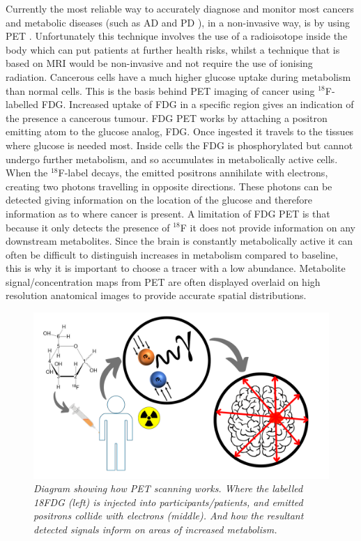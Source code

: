 Currently the most reliable way to accurately diagnose and monitor most cancers and metabolic diseases (such as \ac{AD} \cite{Shokouhi2014ImagingTomography} and \ac{PD} \cite{Meles2017MetabolicDisease}), in a non-invasive way, is by using \ac{PET} \cite{Almuhaideb201118F-FDGOncology}. Unfortunately this technique involves the use of a radioisotope inside the body which can put patients at further health risks, whilst a technique that is based on \ac{MRI} would be non-invasive and not require the use of ionising radiation. Cancerous cells have a much higher glucose uptake during metabolism than normal cells. This is the basis behind \ac{PET} imaging of cancer using $^{18}$F-labelled \ac{FDG}. Increased uptake of \ac{FDG} in a specific region gives an indication of the presence a cancerous tumour. \ac{FDG} \ac{PET} works by attaching a positron emitting atom to the glucose analog, \ac{FDG}. Once ingested it travels to the tissues where glucose is needed most. Inside cells the \ac{FDG} is phosphorylated but cannot undergo further metabolism, and so accumulates in metabolically active cells. When the $^{18}$F-label decays, the emitted positrons annihilate with electrons, creating two photons travelling in opposite directions. These photons can be detected giving information on the location of the glucose and therefore information as to where cancer is present. A limitation of \ac{FDG} \ac{PET} is that because it only detects the presence of $^{18}$F it does not provide information on any downstream metabolites. Since the brain is constantly metabolically active it can often be difficult to distinguish increases in metabolism compared to baseline, this is why it is important to choose a tracer with a low abundance. Metabolite signal/concentration maps from \ac{PET} are often displayed overlaid on high resolution anatomical images to provide accurate spatial distributions.

\begin{figure}
    \centering
    \includegraphics[width=1\textwidth]{Figures/Intro/PET_Scan.png}
    \caption{\textit{Diagram showing how \ac{PET} scanning works. Where the labelled 18FDG (left) is injected into participants/patients, and emitted positrons collide with electrons (middle). And how the resultant detected signals inform on areas of increased metabolism.}}
    \label{fig:intro:PET}
\end{figure}

